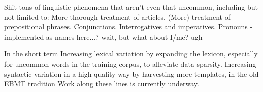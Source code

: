Shit tons of linguistic phenomena that aren't even that uncommon, including but not limited to:
More thorough treatment of articles.
(More) treatment of prepositional phrases.
Conjunctions.
Interrogatives and imperatives.
Pronouns - implemented as names here...? wait, but what about I/me? ugh

In the short term
Increasing lexical variation by expanding the lexicon, especially for uncommon words in the training corpus, to alleviate data sparsity.
Increasing syntactic variation in a high-quality way by harvesting more templates, in the old EBMT tradition
Work along these lines is currently underway.







